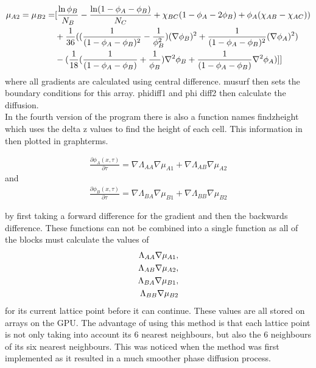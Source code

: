 \documentclass{article}
\numberwithin{equation}{section} %
\begin{document}
 \begin{align}
\mu _{A2} = \mu _{B2} = &[\frac{\ln \phi _{B}}{N_{B}} - \frac{\ln (1- \phi _{A} - \phi _{B})}{N_{C}}+\chi _{BC}(1-\phi _{A} - 2\phi _{B})+\phi _{A}(\chi _{AB} - \chi _{AC}))  \notag \\
& + \frac{1}{36}((\frac{1}{(1 - \phi _{A} - \phi _{B})^2} - \frac{1}{\phi _{B}^2})(\nabla \phi _{B})^2 +\frac{1}{(1-\phi _{A} - \phi _{B})^2}(\nabla \phi _{A})^2) \notag \\
& -(\frac{1}{18}(\frac{1}{(1- \phi _{A} - \phi _{B})} + \frac{1}{\phi _{B}})\nabla ^2\phi _{B} + \frac{1}{(1 - \phi _{A} - \phi _{B})}\nabla ^2\phi _{A})] ]
\end{align}
 where all gradients are calculated using central difference. mu\textunderscore surf then sets the boundary conditions for this array.  phi\textunderscore diff1 and phi \textunderscore diff2 then calculate the diffusion. \\
 In the fourth version of the program there is also a function names find\textunderscore z\textunderscore height which uses the delta z values to find the height of each cell. This information in then plotted in graph\textunderscore  terms. 

 \begin{align}
\frac{\partial \phi _{A}(x, \tau )}{\partial \tau} = \nabla \Lambda _{AA} \nabla \mu _{A1} + \nabla \Lambda _{AB} \nabla \mu _{A2} 
\end{align}
and
 \begin{align}
\frac{\partial \phi _{B}(x, \tau )}{\partial \tau} = \nabla \Lambda _{BA} \nabla \mu _{B1} + \nabla \Lambda _{BB} \nabla \mu _{B2} 
\end{align}

by first taking a forward difference for the gradient and then the backwards difference. These functions can not be combined into a single function as all of the blocks must calculate the values of 
 \begin{align}
\Lambda _{AA} \nabla \mu _{A1}, \notag \\
\Lambda _{AB} \nabla \mu _{A2}, \notag \\
\Lambda _{BA} \nabla \mu _{B1}, \notag \\
\Lambda _{BB} \nabla \mu _{B2}
\end{align}
for its current lattice point before it can continue. These values are all stored on arrays on the GPU. The advantage of using this method is that each lattice point is not only taking into account its 6 nearest neighbours, but also the 6 neighbours of its six nearest neighbours. This was noticed when the method was first implemented as it resulted in a much smoother phase diffusion process.  
\end{document}
